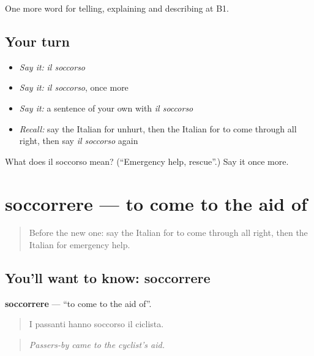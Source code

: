 \begin{grammarlens}[title={What you've built}]
One more word for telling, explaining and describing at B1.
\end{grammarlens}

\subsection*{Your turn}
\begin{itemize}
\raggedright
  \item \emph{Say it:} \emph{il soccorso}
  \item \emph{Say it:} \emph{il soccorso}, once more
  \item \emph{Say it:} a sentence of your own with \emph{il soccorso}
  \item \emph{Recall:} say the Italian for unhurt, then the Italian for to come through all right, then say \emph{il soccorso} again
\end{itemize}

\begin{tcolorbox}[breakable,colback=teal!4,colframe=teal!35!black,title={Before you move on}]
What does il soccorso mean? (\textquotedblleft{}Emergency help, rescue\textquotedblright{}.) Say it once more.
\end{tcolorbox}
\section[soccorrere]{soccorrere — to come to the aid of}

\label{lesson:IT-C301-soccorrere}



\begin{quote}
Before the new one: say the Italian for to come through all right, then the Italian for emergency help.
\end{quote}

\subsection*{You'll want to know: soccorrere}
\textbf{soccorrere} — \textquotedblleft{}to come to the aid of\textquotedblright{}.

\begin{quote}
I passanti hanno soccorso il ciclista.
\end{quote}

\begin{quote}
\emph{Passers-by came to the cyclist's aid.}
\end{quote}

